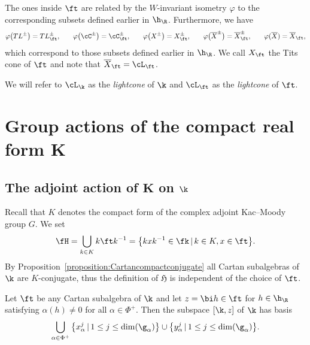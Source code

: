 The ones inside $\ft$ are related by the $W$-invariant isometry $\varphi$ to the corresponding subsets defined earlier in $\h_\R$.
Furthermore, we have
\begin{gather*} \varphi\big(TL^\pm\big) = TL_\ft^\pm,\qquad\! \varphi\big(\cC^\pm\big) = \cC_\ft^\pm,\qquad\! \varphi\big(X^\pm\big) = X_\ft^\pm,\qquad\!
\varphi\big(\overline{X}^\pm\big) = \overline{X}_\ft^\pm,\qquad\! \varphi(\overline{X}) = \overline{X}_\ft,
\end{gather*}
which correspond to those subsets defined earlier in $\h_\R$. We call $X_{\ft}$ the Tits cone of $\ft$ and note that $\overline{X}_\ft = \cL_{\ft}$.

\begin{Remark}\label{remark:lightconecompactform}
We will refer to $\cL_{\k}$ as the {\em lightcone} of $\k$ and $\cL_{\ft}$ as the {\em lightcone} of $\ft$.
\end{Remark}

\section[Group actions of the compact real form $K$]{Group actions of the compact real form $\boldsymbol{K}$}

\subsection[The adjoint action of $K$ on $\k$]{The adjoint action of $\boldsymbol{K}$ on $\boldsymbol{\k}$}\label{subsection:globalstructureAdjointaction}

Recall that $K$ denotes the compact form of the complex adjoint Kac--Moody group $G$. We set
\[\fH = \bigcup_{k\in K} k \ft k^{-1} = \big\{k x k^{-1}\in \fk \,|\, k\in K, x \in \ft\big\}.\]
By Proposition~\ref{proposition:Cartancompactconjugate} all Cartan subalgebras of $\k$ are $K$-conjugate, thus the definition of $\mathfrak{H}$ is independent of the choice of $\ft$.

\begin{Proposition}\label{proposition:tangentspace}Let $\ft$ be any Cartan subalgebra of $\k$ and let $z = \bi h\in\ft$ for $h\in\h_\R$ satisfying $\alpha(h)\neq 0$ for all $\alpha\in\Phi^+$.
Then the subspace $[\k,z]$ of $\k$ has basis
\[\bigcup_{\alpha\in\Phi^+} \big\{ x_{\alpha}^{j}\, |\, 1\leq j\leq \dim (\g_{\alpha})\big\} \cup
 \big\{ y_{\alpha}^{j} \, |\, 1\leq j\leq \dim (\g_{\alpha}) \big\}.\]
\end{Proposition}


